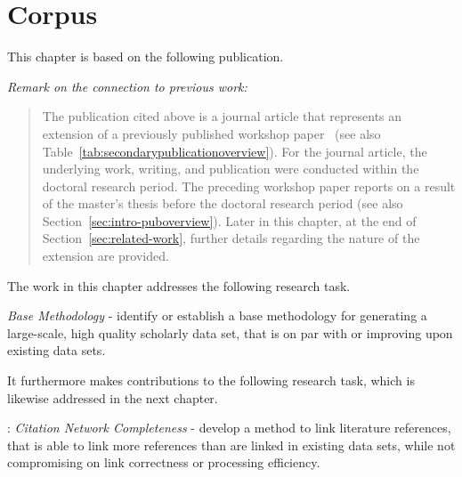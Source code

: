 \chapter{Corpus}
\label{chp:corpus}

This chapter is based on the following publication.

\begin{infobox-pub}
\end{infobox-pub}
\vspace{-0.5em}
\begin{footnotesize}
\textit{Remark on the connection to previous work:}
\vspace{-0.5em}
\begin{quote}
The publication cited above is a journal article that represents an extension of a previously published workshop paper~\cite{Saier2019} (see also Table~\ref{tab:secondarypublicationoverview}). For the journal article, the underlying work, writing, and publication were conducted within the doctoral research period. The preceding workshop paper reports on a result of the master's thesis before the doctoral research period (see also Section~\ref{sec:intro-puboverview}). Later in this chapter, at the end of Section~\ref{sec:related-work}, further details regarding the nature of the extension are provided.
\end{quote}
\end{footnotesize}

The work in this chapter addresses the following research task.

\begin{rtlist}
    \item \textit{Base Methodology} - identify or establish a base methodology for generating a large-scale, high quality scholarly data set, that is on par with or improving upon existing data sets.
\end{rtlist}

It furthermore makes contributions to the following research task, which is likewise addressed in the next chapter.

\begin{rtlist}
    \item[\rtmark{2}:] \textit{Citation Network Completeness} - develop a method to link literature references, that is able to link more references than are linked in existing data sets, while not compromising on link correctness or processing efficiency.
\end{rtlist}

